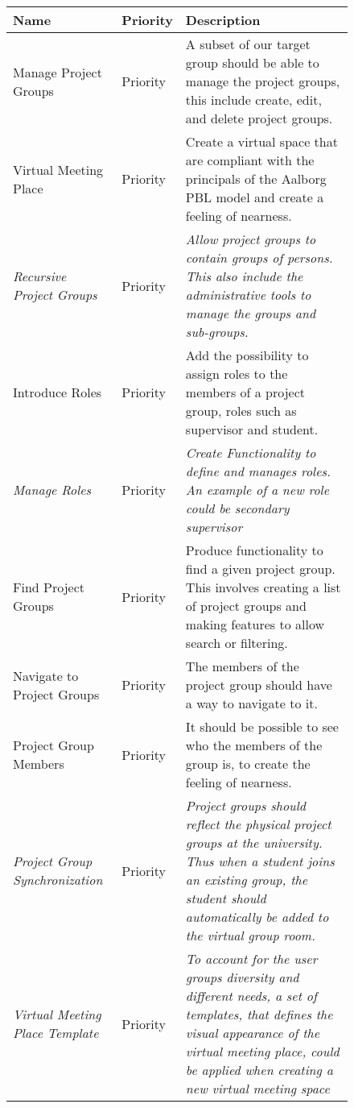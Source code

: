 \begin{figure}%
\begin{tabular}{|p{}|p{}|p{}|}
	\hline
	
	\textbf{Name} & \textbf{Priority} & \textbf{Description} \\
	\hline
	Manage Project Groups & Priority & A subset of our target group should be able to manage the project groups, this include create, edit, and delete project groups.  \\
	\hline
	Virtual Meeting Place & Priority & Create a virtual space that are compliant with the principals of the Aalborg PBL model and create a feeling of nearness.  \\
	\hline
	\textit{Recursive Project Groups} & Priority & \textit{Allow project groups to contain groups of persons. This also include the administrative tools to manage the groups and sub-groups.} \\
	\hline
	Introduce Roles & Priority & Add the possibility to assign roles to the members of a project group, roles such as supervisor and student.   \\
	\hline
	\textit{Manage Roles} & Priority & \textit{Create Functionality to define and manages roles. An example of a new role  could be secondary supervisor} \\
	\hline
	Find Project Groups & Priority & Produce functionality to find a given project group. This involves creating a list of project groups and making features to allow search or filtering. \\
	\hline
	Navigate to Project Groups & Priority & The members of the project group should have a way to navigate to it. \\
	\hline
	Project Group Members & Priority & It should be possible to see who the members of the group is, to create the feeling of nearness. \\
	\hline
	\textit{Project Group Synchronization} & Priority & \textit{Project groups should reflect the physical project groups at the university. Thus when a student joins an existing group, the student should automatically be added to the virtual group room.}  \\
	\hline 
	\textit{Virtual Meeting Place Template} & Priority & \textit{To account for the user groups diversity and different needs, a set of templates, that defines the visual appearance of the virtual meeting place, could be applied when creating a new virtual meeting space }  \\
	\hline 


	
	
	
\end{tabular}
\label{fig:productbacklog}
\end{figure}

\FloatBarrier